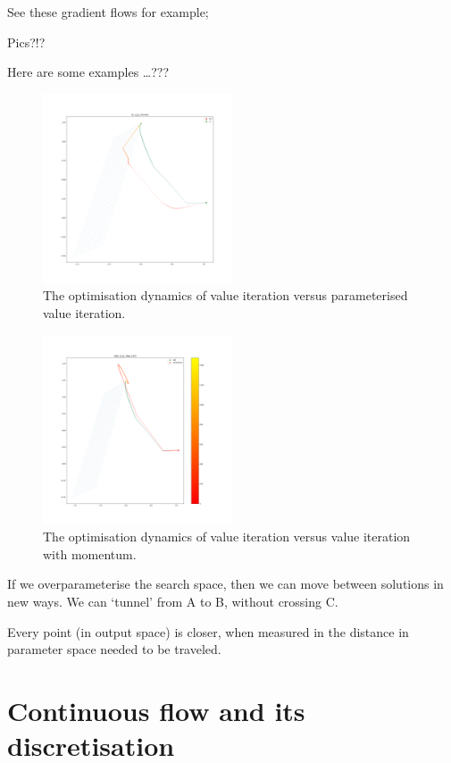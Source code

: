 See these gradient flows for example;

Pics?!?

Here are some examples \ldots{}???

\begin{figure}
\centering
\includegraphics[width=0.5\textwidth,height=0.5\textheight]{../../pictures/figures/vi-vs-pvi.png}
\caption{The optimisation dynamics of value iteration versus parameterised value iteration.}
\end{figure}

\begin{figure}
\centering
\includegraphics[width=0.5\textwidth,height=0.5\textheight]{../../pictures/figures/vi_sgd-vs-vi_mom.png}
\caption{The optimisation dynamics of value iteration versus value iteration with momentum.}
\end{figure}

If we overparameterise the search space, then we can move between solutions in new ways. We can `tunnel' from A to B, without crossing C.

Every point (in output space) is closer, when measured in the distance in parameter space needed to be traveled.


\section{Continuous flow and its discretisation}

